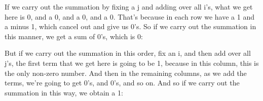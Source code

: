 \documentclass[pdftex, brazil, 12pt, twoside]{article}
\begin{document}
If we carry out the summation by fixing a j and adding over
all i's, what we get here is 0, and a 0, and a 0, and a 0.
That's because in each row we have a 1 and a minus 1, which
cancel out and give us 0's.
So if we carry out the summation in this manner, we
get a sum of 0's, which is 0:

\begin{figure}[H]
  \begin{center}
  \end{center}
\end{figure}

But if we carry out the summation in this order, fix
an i, and then add over all j's, the first term that we
get here is going to be 1, because in this column, this
is the only non-zero number.
And then in the remaining columns, as we add the terms,
we're going to get 0's, and 0's, and so on.
And so if we carry out the summation in this way, we
obtain a 1:

\begin{figure}[H]
  \begin{center}
  \end{center}
\end{figure}
\end{document}
